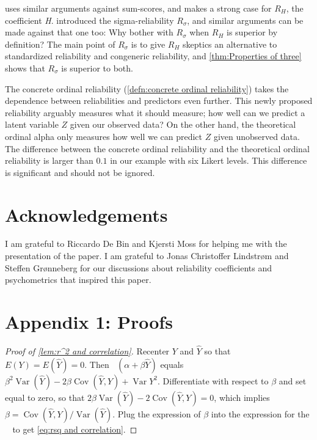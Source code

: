 \documentclass[twoside]{article}
\DeclareMathOperator{\Var}{Var}
\DeclareMathOperator{\Cov}{Cov}
\DeclareMathOperator{\MSE}{MSE_Z}
\begin{document}
\citet{McNeish2019-ea} uses similar arguments against sum-scores, and makes a strong case for $ R_H$, the coefficient \textit{H}.  introduced the sigma-reliability $ R_\sigma$, and similar arguments can be made against that one too: Why bother with $ R_\sigma$ when $ R_H$ is superior by definition? The main point of $ R_\sigma$ is to give $ R_H$ skeptics an alternative to standardized reliability and congeneric reliability, and \cref{thm:Properties of three} shows that $ R_\sigma$ is superior to both. 

The concrete ordinal reliability (\cref{defn:concrete ordinal reliability}) takes the dependence between reliabilities and predictors even further. This newly proposed reliability arguably measures what it should measure; how well can we predict a latent variable $Z$ given our observed data? On the other hand, the theoretical ordinal alpha only measures how well we can predict $Z$ given unobserved data. The difference between the concrete ordinal reliability and the theoretical ordinal reliability is larger than $0.1$ in our example with six Likert levels. This difference is significant and should not be ignored.

\section{Acknowledgements}
I am grateful to Riccardo De Bin and Kjersti Moss for helping me with the presentation of the paper. I am grateful to Jonas Christoffer Lindstrøm and Steffen Grønneberg for our discussions about reliability coefficients and psychometrics that inspired this paper.

\clearpage
\section*{Appendix 1: Proofs}
\label{Appendix 1}

\begin{proof}[Proof of \cref{lem:r^2 and correlation}]\label{proof:r^2 and correlation}
Recenter $Y$ and $\hat{Y}$ so that $E(Y)=E(\hat{Y})=0$. Then $\MSE(\alpha+\beta\hat{Y})$ equals $\beta^{2}\Var(\hat{Y})-2\beta\Cov(\hat{Y},Y)+\Var Y^{2}$.
Differentiate with respect to $\beta$ and set equal to zero, so that
$2\beta\Var(\hat{Y})-2\Cov(\hat{Y},Y)=0$, which implies $\beta=\Cov(\hat{Y},Y)/\Var(\hat{Y})$. Plug the expression of $\beta$ into the expression for the $\MSE$ to get \cref{eq:rsq and correlation}.
\end{proof}
\end{document}
